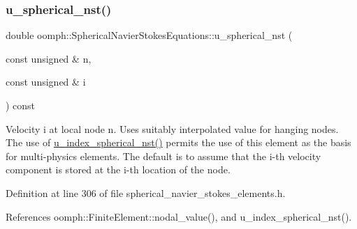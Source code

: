 \mbox{\label{classoomph_1_1SphericalNavierStokesEquations_a51514fae13c21583c958157a75a943bc}} 
\subsubsection{\texorpdfstring{u\+\_\+spherical\+\_\+nst()}{u\_spherical\_nst()}\hspace{0.1cm}{\footnotesize\ttfamily [1/2]}}
{\footnotesize\ttfamily double oomph\+::\+Spherical\+Navier\+Stokes\+Equations\+::u\+\_\+spherical\+\_\+nst (\begin{DoxyParamCaption}\item[{const unsigned \&}]{n,  }\item[{const unsigned \&}]{i }\end{DoxyParamCaption}) const\hspace{0.3cm}{\ttfamily [inline]}}



Velocity i at local node n. Uses suitably interpolated value for hanging nodes. The use of \hyperlink{classoomph_1_1SphericalNavierStokesEquations_a2f269e20874a87df919cc4ece4b05fe5}{u\+\_\+index\+\_\+spherical\+\_\+nst()} permits the use of this element as the basis for multi-\/physics elements. The default is to assume that the i-\/th velocity component is stored at the i-\/th location of the node. 



Definition at line 306 of file spherical\+\_\+navier\+\_\+stokes\+\_\+elements.\+h.



References oomph\+::\+Finite\+Element\+::nodal\+\_\+value(), and u\+\_\+index\+\_\+spherical\+\_\+nst().

\mbox{\label{classoomph_1_1SphericalNavierStokesEquations_ad51d5e5080680802ad1ee5daab91765d}} 
